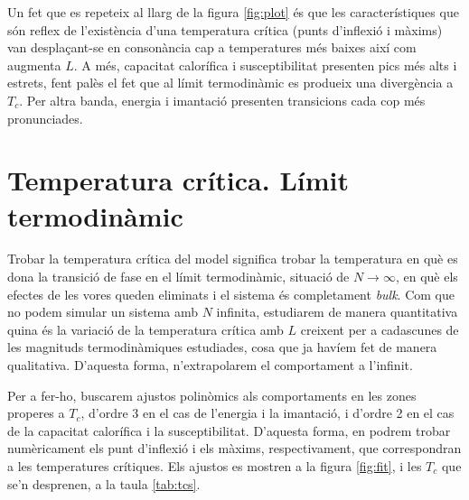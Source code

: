 \documentclass[a4paper]{article}
\begin{document}
Un fet que es repeteix al llarg de la figura \ref{fig:plot} és que les característiques que són reflex de l'existència d'una temperatura crítica (punts d'inflexió i màxims) van desplaçant-se en consonància cap a temperatures més baixes així com augmenta $L$. A més, capacitat calorífica i susceptibilitat presenten pics més alts i estrets, fent palès el fet que al límit termodinàmic es produeix una divergència a $T_c$. Per altra banda, energia i imantació presenten transicions cada cop més pronunciades.

\section{Temperatura crítica. Límit termodinàmic}

Trobar la temperatura crítica del model significa trobar la temperatura en què es dona la transició de fase en el límit termodinàmic, situació de $N \to \infty$, en què els efectes de les vores queden eliminats i el sistema és completament \textit{bulk}. Com que no podem simular un sistema amb $N$ infinita, estudiarem de manera quantitativa quina és la variació de la temperatura crítica amb $L$ creixent per a cadascunes de les magnituds termodinàmiques estudiades, cosa que ja havíem fet de manera qualitativa. D'aquesta forma, n'extrapolarem el comportament a l'infinit.

Per a fer-ho, buscarem ajustos polinòmics als comportaments en les zones properes a $T_c$, d'ordre 3 en el cas de l'energia i la imantació, i d'ordre 2 en el cas de la capacitat calorífica i la susceptibilitat. D'aquesta forma, en podrem trobar numèricament els punt d'inflexió i els màxims, respectivament, que correspondran a les temperatures crítiques. Els ajustos es mostren a la figura \ref{fig:fit}, i les $T_c$ que se'n desprenen, a la taula \ref{tab:tcs}.
\end{document}
